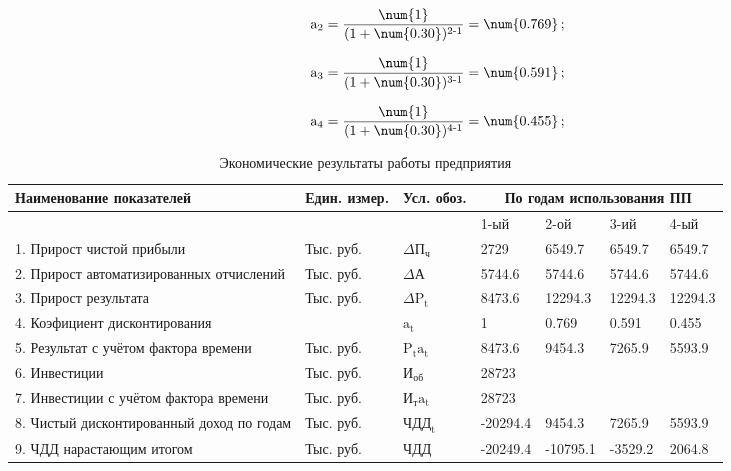 \begin{equation}    
    \text{a}_\text{2} =\frac{\num{1}}{(1+\num{0.30})^\text{2-1}} = \num{0.769} \text{\,;}
\end{equation}
    
\begin{equation}     
    \text{a}_\text{3} =\frac{\num{1}}{(1+\num{0.30})^\text{3-1}} = \num{0.591} \text{\,;}
\end{equation}
    
\begin{equation}      
    \text{a}_\text{4} =\frac{\num{1}}{(1+\num{0.30})^\text{4-1}} = \num{0.455} \text{\,;}
\end{equation}
    
\begin{table}[ht]
\caption{Экономические результаты работы предприятия}
\begin{tabular}{|p{35mm}|p{10mm}|p{10mm}|p{20mm}|p{20mm}|p{20mm}|p{20mm}|}
\hline
Наименование показателей & Един. измер. & Усл. обоз. & \multicolumn{4}{c|}{По годам использования ПП}     \\ \hline
\multicolumn{1}{|c|}{} & & & 1-ый & 2-ой & 3-ий & 4-ый \\ \hline
1. Прирост чистой прибыли & Тыс. руб. & $\Delta \text{П}_\text{ч} $ & 2729 & 6549.7 & 6549.7 & 6549.7 \\ \hline
2. Прирост автоматизированных отчислений & Тыс. руб. &  $\Delta \text{А} $ & 5744.6 & 5744.6 & 5744.6 & 5744.6   \\ \hline
3. Прирост результата & Тыс. руб. & $ \Delta \text{P}_\text{t} $ & 8473.6 & 12294.3 & 12294.3 & 12294.3 \\ \hline
4. Коэфициент дисконтирования & & $\text{a}_\text{t} $ & 1 & 0.769 & 0.591 & 0.455 \\ \hline
5. Результат с учётом фактора времени & Тыс. руб. & $\text{P}_\text{t}\text{a}_\text{t} $ & 8473.6 & 9454.3 & 7265.9 & 5593.9 \\ \hline
6. Инвестиции & Тыс. руб. &  $ \text{И}_\text{об} $ & 28723 & & & \\ \hline
7. Инвестиции с  учётом фактора времени & Тыс. руб. & $ \text{И}_\text{т}\text{a}_\text{t} $ & 28723 & & & \\ \hline
8. Чистый дисконтированный доход по годам & Тыс. руб. & $\text{ЧДД}_\text{t}$ & -20294.4 & 9454.3 & 7265.9 & 5593.9 \\ \hline
9. ЧДД нарастающим итогом & Тыс. руб. & $\text{ЧДД} $ & -20249.4 & -10795.1 & -3529.2
 & 2064.8 \\ \hline
\end{tabular}
\end{table}

